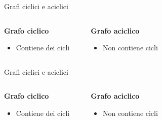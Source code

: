 \documentclass[compress]{beamer}
\begin{document}
\begin{frame}{Grafi ciclici e aciclici}
  \begin{columns}
    \begin{block}{\textbf{Grafo ciclico}}
      \begin{itemize}
        \item Contiene dei cicli
      \end{itemize}
    \end{block}
    \begin{center}
    
  \end{center}
    \begin{block}{\textbf{Grafo aciclico}}
      \begin{itemize}
        \item Non contiene cicli
      \end{itemize}
    \end{block}
    \begin{center}
    
    \end{center}
  \end{columns}
\end{frame}

\begin{frame}{Grafi ciclici e aciclici}
  \begin{columns}
    \begin{block}{\textbf{Grafo ciclico}}
      \begin{itemize}
        \item Contiene dei cicli
      \end{itemize}
    \end{block}
    \begin{center}
    
  \end{center}
    \begin{block}{\textbf{Grafo aciclico}}
      \begin{itemize}
        \item Non contiene cicli
      \end{itemize}
    \end{block}
    \begin{center}
    
    \end{center}
  \end{columns}
\end{frame}
\end{document}
